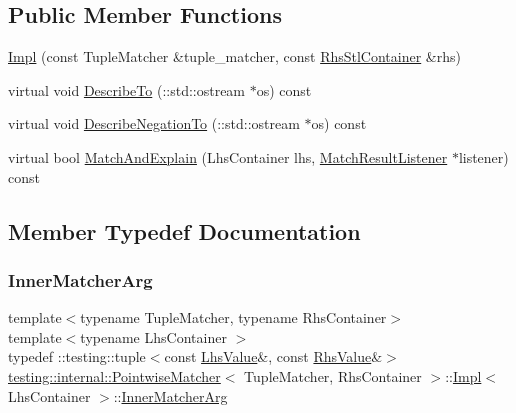 \subsection*{Public Member Functions}
\begin{DoxyCompactItemize}
\item 
\hyperlink{classtesting_1_1internal_1_1_pointwise_matcher_1_1_impl_aaf6841b254ef78395919dfc5705dd152}{Impl} (const Tuple\+Matcher \&tuple\+\_\+matcher, const \hyperlink{classtesting_1_1internal_1_1_pointwise_matcher_aadbaec8c93351f29b103816c2e397edd}{Rhs\+Stl\+Container} \&rhs)
\item 
virtual void \hyperlink{classtesting_1_1internal_1_1_pointwise_matcher_1_1_impl_a0c699f62bbd02595471b793baa9cc75e}{Describe\+To} (\+::std\+::ostream $\ast$os) const
\item 
virtual void \hyperlink{classtesting_1_1internal_1_1_pointwise_matcher_1_1_impl_a26d3a829149e4c497aaced42aad7b247}{Describe\+Negation\+To} (\+::std\+::ostream $\ast$os) const
\item 
virtual bool \hyperlink{classtesting_1_1internal_1_1_pointwise_matcher_1_1_impl_a4253946989f3743c4dd983909f2d062b}{Match\+And\+Explain} (Lhs\+Container lhs, \hyperlink{classtesting_1_1_match_result_listener}{Match\+Result\+Listener} $\ast$listener) const
\end{DoxyCompactItemize}


\subsection{Member Typedef Documentation}
\mbox{\label{classtesting_1_1internal_1_1_pointwise_matcher_1_1_impl_aba9d983881cbfbb37724b8b40e863898}} 
\subsubsection{\texorpdfstring{Inner\+Matcher\+Arg}{InnerMatcherArg}}
{\footnotesize\ttfamily template$<$typename Tuple\+Matcher, typename Rhs\+Container$>$ \\
template$<$typename Lhs\+Container $>$ \\
typedef \+::testing\+::tuple$<$const \hyperlink{classtesting_1_1internal_1_1_pointwise_matcher_1_1_impl_a453769e721f4212e399f76c980b4b65c}{Lhs\+Value}\&, const \hyperlink{classtesting_1_1internal_1_1_pointwise_matcher_a9f7f1abbfa795033e1e1c1df385b4617}{Rhs\+Value}\&$>$ \hyperlink{classtesting_1_1internal_1_1_pointwise_matcher}{testing\+::internal\+::\+Pointwise\+Matcher}$<$ Tuple\+Matcher, Rhs\+Container $>$\+::\hyperlink{classtesting_1_1internal_1_1_pointwise_matcher_1_1_impl}{Impl}$<$ Lhs\+Container $>$\+::\hyperlink{classtesting_1_1internal_1_1_pointwise_matcher_1_1_impl_aba9d983881cbfbb37724b8b40e863898}{Inner\+Matcher\+Arg}}

